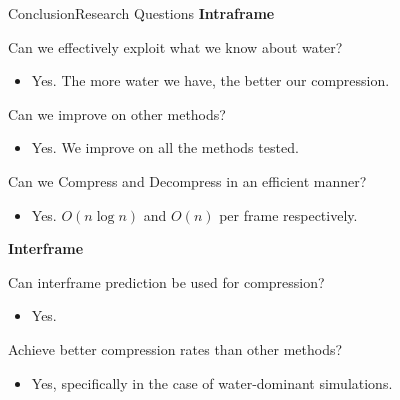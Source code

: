 \documentclass{beamer}
\begin{document}
\begin{frame}{Conclusion}{Research Questions}
\textbf{Intraframe}

Can we effectively exploit what we know about water?
\begin{itemize}
  \item Yes. The more water we have, the better our compression.
\end{itemize}

Can we improve on other methods?
\begin{itemize}
  \item Yes. We improve on all the methods tested.
\end{itemize}

Can we Compress and Decompress in an efficient manner?
\begin{itemize}
  \item Yes. $O(n \log n)$ and $O(n)$ per frame respectively.
\end{itemize}

\textbf{Interframe}

Can interframe prediction be used for compression?
\begin{itemize}
  \item Yes.
\end{itemize}

Achieve better compression rates than other methods?
\begin{itemize}
  \item Yes, specifically in the case of water-dominant simulations.
\end{itemize}

\end{frame}
\end{document}
